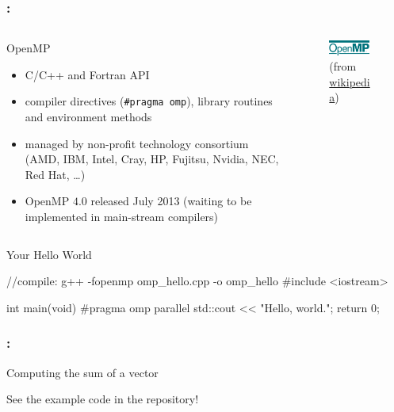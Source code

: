\documentclass[9pt,xcolor=table]{beamer}
\begin{document}
\begin{frame}[fragile]
\frametitle{\insertsectionhead{}: \insertsubsectionhead{}}
\begin{columns}[c]
  \begin{column}{.7\textwidth}
    \begin{block}{OpenMP}
      \begin{itemize}
      \item C/C++ and Fortran API
      \item compiler directives (\texttt{\#pragma omp}), library routines and environment methods
      \item managed by non-profit technology consortium (AMD, IBM, Intel, Cray, HP, Fujitsu, Nvidia, NEC, Red Hat, \dots{})
      \item OpenMP $4.0$ released July 2013 (waiting to be implemented in main-stream compilers)
      \end{itemize}
    \end{block}
  \end{column}
    \begin{column}{.25\textwidth}
      \begin{figure}[htb]
        \includegraphics[width=0.9\textwidth]{img/Openmp}\\[2pt]\small
        (from \href{http://en.wikipedia.org/wiki/Openmp}{wikipedia})
      \end{figure}
    \end{column}
  \end{columns}
\pause
\begin{block}{Your Hello World}
  \begin{pyglist}[language=c++,numbers=left,style=emacs,fontsize=\small]
//compile: g++ -fopenmp omp_hello.cpp -o omp_hello
#include <iostream>

int main(void)
{
  #pragma omp parallel
  std::cout << "Hello, world.\n";
  return 0;
}
  \end{pyglist}
\end{block}
\end{frame}


\begin{frame}
\frametitle{\insertsectionhead{}: \insertsubsectionhead{}}
\begin{block}{Computing the sum of a vector}
  \vfill
  \begin{center}
    \huge See the example code in the repository!
  \end{center}
  \vfill
\end{block}
\end{frame}
\end{document}
